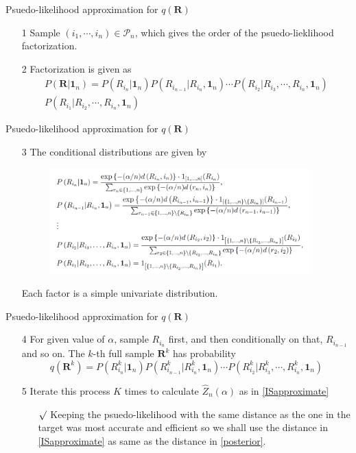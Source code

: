 \documentclass[11pt]{beamer}
\newcommand{\rmk}{$\surd$}
\begin{document}
\begin{frame}{Psuedo-likelihood approximation for $q(\mathbf{R})$}
\begin{itemize}
    \item[1] Sample $(i_1, \cdots, i_n)\in \mathcal{P}_n$, which gives the order of the psuedo-lieklihood factorization.
    \item[2] Factorization is given as 
    \begin{multline*}
        P(\mathbf{R}|\mathbf{1}_n)=P(R_{i_n}|\mathbf{1}_n)P(R_{i_{n-1}}|R_{i_n}, \mathbf{1}_n)\cdots P(R_{i_2}|R_{i_3}, \cdots, R_{i_n}, \mathbf{1}_n)\\P(R_{i_1}|R_{i_2}, \cdots, R_{i_n}, \mathbf{1}_n)
    \end{multline*}      
\end{itemize}
\end{frame}

\begin{frame}{Psuedo-likelihood approximation for $q(\mathbf{R})$}
\begin{itemize}
    \item[3] The conditional distributions are given by
    \begin{figure}[h]
        \includegraphics[width=10cm]{ConDist.png}
    \end{figure}
    Each factor is a simple univariate distribution. 
\end{itemize}
\end{frame}

\begin{frame}{Psuedo-likelihood approximation for $q(\mathbf{R})$}
\begin{itemize}
    \item[4] For given value of $\alpha$, sample $R_{i_n}$ first, and then conditionally on that, $R_{i_{n-1}}$ and so on. The $k$-th full sample $\mathbf{R}^k$ has probability 
    \begin{equation*}
        q(\mathbf{R}^k)=P(R_{i_n}^k|\mathbf{1}_n)P(R_{i_{n-1}}^k|R_{i_n}^k, \mathbf{1}_n)\cdots P(R_{i_2}^k|R_{i_3}^k, \cdots, R_{i_n}^k, \mathbf{1}_n)
    \end{equation*} 
    \item[5] Iterate this process $K$ times to calculate $\hat{Z}_n(\alpha)$ as in \eqref{ISapproximate}
    \begin{itemize}
        \item[\rmk] Keeping the psuedo-likelihood with the same distance as the one in the target was most accurate and efficient so we shall use the distance in \eqref{ISapproximate} as same as the distance in \eqref{posterior}. 
    \end{itemize} 
\end{itemize}
\end{frame}
\end{document}
